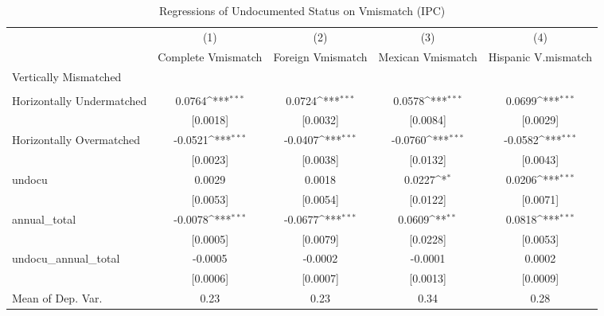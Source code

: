 \begin{table}[htbp]\centering
\def\sym#1{\ifmmode^{#1}\else\(^{#1}\)\fi}
\caption{Regressions of Undocumented Status on Vmismatch (IPC)}
\begin{tabular}{l*{4}{c}}
\toprule
                    &\multicolumn{1}{c}{(1)}         &\multicolumn{1}{c}{(2)}         &\multicolumn{1}{c}{(3)}         &\multicolumn{1}{c}{(4)}         \\
                    &Complete Vmismatch         &Foreign Vmismatch         &Mexican Vmismatch         &Hispanic V.mismatch         \\
\midrule
Vertically Mismatched&                     &                     &                     &                     \\
                    &                     &                     &                     &                     \\
\addlinespace
Horizontally Undermatched&      0.0764\sym{***}&      0.0724\sym{***}&      0.0578\sym{***}&      0.0699\sym{***}\\
                    &    [0.0018]         &    [0.0032]         &    [0.0084]         &    [0.0029]         \\
\addlinespace
Horizontally Overmatched&     -0.0521\sym{***}&     -0.0407\sym{***}&     -0.0760\sym{***}&     -0.0582\sym{***}\\
                    &    [0.0023]         &    [0.0038]         &    [0.0132]         &    [0.0043]         \\
\addlinespace
undocu              &      0.0029         &      0.0018         &      0.0227\sym{*}  &      0.0206\sym{***}\\
                    &    [0.0053]         &    [0.0054]         &    [0.0122]         &    [0.0071]         \\
\addlinespace
annual\_total        &     -0.0078\sym{***}&     -0.0677\sym{***}&      0.0609\sym{**} &      0.0818\sym{***}\\
                    &    [0.0005]         &    [0.0079]         &    [0.0228]         &    [0.0053]         \\
\addlinespace
undocu\_annual\_total &     -0.0005         &     -0.0002         &     -0.0001         &      0.0002         \\
                    &    [0.0006]         &    [0.0007]         &    [0.0013]         &    [0.0009]         \\
\midrule
Mean of Dep. Var.   &        0.23         &        0.23         &        0.34         &        0.28         \\

\end{tabular}
\end{table}
